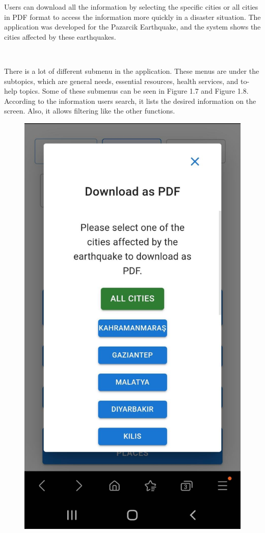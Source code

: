 Users can download all the information by selecting the specific cities or all cities in PDF format to access the information more quickly in a disaster situation. The application was developed for the Pazarcik Earthquake, and the system shows the cities affected by these earthquakes.

~\par There is a lot of different submenu in the application. These menus are under the subtopics, which are general needs, essential resources, health services, and to-help topics. Some of these submenus can be seen in Figure 1.7 and Figure 1.8. According to the information users search, it lists the desired information on the screen. Also, it allows filtering like the other functions. 

\begin{figure}[H]
    \begin{center}
        \includegraphics[scale = 0.15]{assets/pdf.jpeg}

\end{center}
\end{figure}
